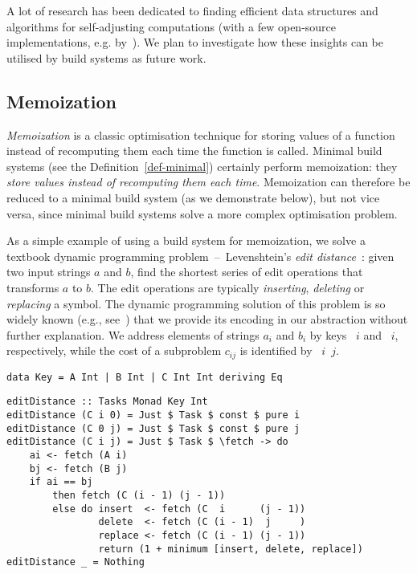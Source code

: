 A lot of research has been dedicated to finding efficient data structures and
algorithms for self-adjusting computations (with a few open-source
implementations, e.g. \Incremental by~\citet{incremental}). We plan to
investigate how these insights can be utilised by build systems as future work.

\subsection{Memoization}\label{sec-related-memo}

\emph{Memoization} is a classic optimisation technique for storing values of a
function instead of recomputing them each time the function is called. Minimal
build systems (see the Definition~\ref{def-minimal}) certainly perform
memoization: they \emph{store values instead of recomputing them each time}.
Memoization can therefore be reduced to a minimal build system (as we
demonstrate below), but not vice versa, since minimal build systems solve a more
complex optimisation problem.

As a simple example of using a build system for memoization, we solve a textbook
dynamic programming problem~--~Levenshtein's \emph{edit
distance}~\cite{levenshtein1966binary}: given two input strings $a$ and
$b$, find the shortest series of edit operations that transforms $a$
to $b$. The edit operations are typically \emph{inserting}, \emph{deleting} or
\emph{replacing} a symbol. The dynamic programming solution of this problem is
so widely known (e.g., see~\cite{cormen2001introduction}) that we provide its
encoding in our  abstraction without further explanation. We address
elements of strings $a_i$ and $b_i$ by keys ~$i$ and ~$i$,
respectively, while the cost of a subproblem $c_{ij}$ is identified by
~$i$~$j$.

\vspace{0.5mm}
\begin{verbatim}
data Key = A Int | B Int | C Int Int deriving Eq
\end{verbatim}
\vspace{0mm}
\begin{verbatim}
editDistance :: Tasks Monad Key Int
editDistance (C i 0) = Just $ Task $ const $ pure i
editDistance (C 0 j) = Just $ Task $ const $ pure j
editDistance (C i j) = Just $ Task $ \fetch -> do
    ai <- fetch (A i)
    bj <- fetch (B j)
    if ai == bj
        then fetch (C (i - 1) (j - 1))
        else do insert  <- fetch (C  i      (j - 1))
                delete  <- fetch (C (i - 1)  j     )
                replace <- fetch (C (i - 1) (j - 1))
                return (1 + minimum [insert, delete, replace])
editDistance _ = Nothing
\end{verbatim}
\vspace{0.5mm}

